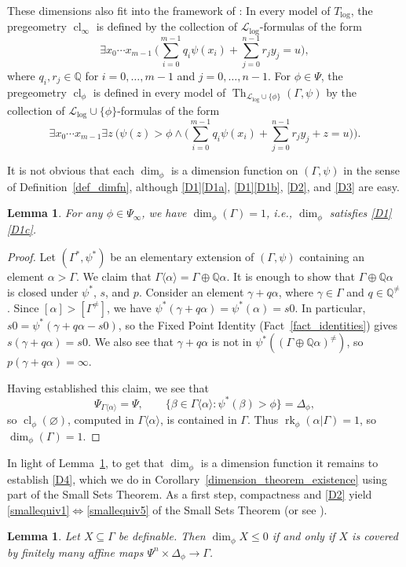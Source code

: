 \documentclass[11pt]{amsart}
\theoremstyle{plain}
\newtheorem{lemma}[thm]{Lemma}
\theoremstyle{definition}
\numberwithin{equation}{section}
\newcommand\Q{\mathbb{Q}}
\newcommand\calL{\mathcal{L}}
\newcommand\0{\varnothing}
\DeclareMathOperator\cl{cl}
\DeclareMathOperator\rk{rk}
\DeclareMathOperator\Th{Th}
\begin{document}
\medskip\noindent
These dimensions also fit into the framework of \cite{angel2016bounded}: In every model of $T_{\log}$, the pregeometry $\cl_{\infty}$ is defined by the collection of $\calL_{\log}$-formulas of the form
\[
\exists x_0\cdots x_{m-1}\ \big(\sum_{i=0}^{m-1} q_i\psi(x_i) + \sum_{j=0}^{n-1} r_jy_j = u\big),
\]
where $q_i, r_j \in \Q$ for $i=0,\dots,m-1$ and $j=0,\dots,n-1$.
For $\phi \in \Psi$, the pregeometry $\cl_{\phi}$ is defined in every model of $\Th_{\calL_{\log}\cup\{\phi\}}(\Gamma,\psi)$ by the collection of $\calL_{\log}\cup\{\phi\}$-formulas of the form
\[
\exists x_0\cdots x_{m-1} \exists z\ \big(\psi(z)>\phi \wedge \big(\sum_{i=0}^{m-1} q_i\psi(x_i) + \sum_{j=0}^{n-1} r_jy_j + z = u\big)\big).
\]


\medskip\noindent
It is not obvious that each $\dim_{\phi}$ is a dimension function on $(\Gamma,\psi)$ in the sense of Definition~\ref{def_dimfn}, although \ref{D1}\ref{D1a}, \ref{D1}\ref{D1b}, \ref{D2}, and \ref{D3} are easy. 

\begin{lemma}\label{lem_Gammanotsmall}
For any $\phi \in \Psi_{\infty}$, we have $\dim_\phi(\Gamma) = 1$, i.e., $\dim_{\phi}$ satisfies \ref{D1}\ref{D1c}.
\end{lemma}
\begin{proof}
Let $(\Gamma^*,\psi^*)$ be an elementary extension of $(\Gamma,\psi)$ containing an element $\alpha> \Gamma$. We claim that $\Gamma\langle \alpha \rangle = \Gamma \oplus \Q\alpha$. It is enough to show that $\Gamma \oplus \Q\alpha$ is closed under $\psi^*$, $s$, and $p$. Consider an element $\gamma+q\alpha$, where $\gamma \in \Gamma$ and $q \in \Q^{\neq}$. Since $[\alpha]>[\Gamma^{\neq}]$, we have $\psi^*(\gamma+q\alpha) = \psi^*(\alpha) = s0$. In particular, $s0 = \psi^*(\gamma+q\alpha-s0)$, so the Fixed Point Identity (Fact~\ref{fact_identities}) gives $s(\gamma+q\alpha) = s0$. We also see that $\gamma+q\alpha$ is not in $\psi^*((\Gamma \oplus \Q\alpha)^{\neq})$, so $p(\gamma+q\alpha) = \infty$.

Having established this claim, we see that
\[
\Psi_{\Gamma\langle \alpha \rangle}= \Psi,\qquad \{\beta \in \Gamma\langle \alpha \rangle:\psi^*(\beta)>\phi\} = \Delta_\phi,
\]
so $\cl_\phi(\varnothing)$, computed in $\Gamma\langle \alpha \rangle$, is contained in $\Gamma$. Thus $\rk_\phi(\alpha|\Gamma) = 1$, so $\dim_\phi(\Gamma) = 1$. 
\end{proof}

\medskip\noindent
In light of Lemma~\ref{lem_Gammanotsmall},
to get that $\dim_{\phi}$ is a dimension function it remains to establish \ref{D4}, which we do in Corollary~\ref{dimension_theorem_existence} using part of the Small Sets Theorem.
As a first step, compactness and \ref{D2} yield \eqref{smallequiv1}$\Leftrightarrow$\eqref{smallequiv5} of the Small Sets Theorem (or see \cite[Lemma~2.3]{angel2016bounded}).
\begin{lemma}\label{lem_dphi0equivdphiset}
Let $X\subseteq\Gamma$ be definable.
Then $\dim_{\phi} X \leq 0$ if and only if $X$ is covered by finitely many affine maps $\Psi^n\times\Delta_{\phi} \to \Gamma$.
\end{lemma}
\end{document}
